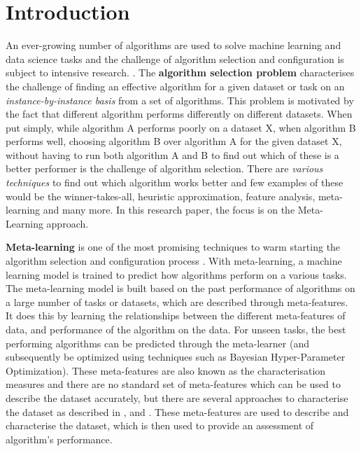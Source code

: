\chapter{Introduction}
An ever-growing number of algorithms are used to solve machine learning and data science tasks and the challenge of algorithm selection and configuration is subject to intensive research.  \citep{bischl-et-al,brazdil:p,calandra-et-al,collins-et-al2018,romero-et-al,vartak-et-al}. The \textbf{algorithm selection problem} characterises the challenge of finding an effective algorithm for a given dataset or task on an \textit{instance-by-instance basis} from a set of algorithms. This problem is motivated by the fact that different algorithm performs differently on different datasets. When put simply, while algorithm A performs poorly on a dataset X, when algorithm B performs well, choosing algorithm B over algorithm A for the given dataset X, without having to run both algorithm A and B to find out which of these is a better performer is the challenge of algorithm selection. There are \textit{various techniques} to find out which algorithm works better and few examples of these would be the winner-takes-all, heuristic approximation, feature analysis,  meta-learning and many more. In this research paper, the focus is on the Meta-Learning approach.

\textbf{Meta-learning} is one of the most promising techniques to warm starting the algorithm selection and configuration process \citep{hutter-et-al}. With meta-learning, a machine learning model is trained to predict how algorithms perform on a various tasks. The meta-learning model is built based on the past performance of algorithms on a large number of tasks or datasets, which are described through meta-features. It does this by learning the relationships between the different meta-features of data, and performance of the algorithm on the data. For unseen tasks, the best performing algorithms can be predicted through the meta-learner (and subsequently be optimized using techniques such as Bayesian Hyper-Parameter Optimization). These meta-features are also known as the characterisation measures and there are no standard set of meta-features which can be used to describe the dataset accurately, but there are several approaches to characterise the dataset as described in \citep{feurer:m}, \citep{meta-features-1} and \citep{meta-features-2}. These meta-features are used to describe and characterise the dataset, which is then used to provide an assessment of algorithm's performance.

